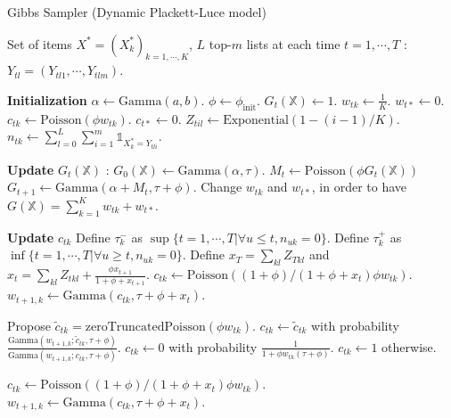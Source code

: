 \documentclass{article}
\begin{document}
\begin{algorithm}
\caption{Gibbs Sampler (Dynamic Plackett-Luce model)}
\begin{algorithmic}
\REQUIRE Set of items $X^*=(X_k^*)_{k=1,\cdots,K}$, $L$ top-$m$ lists at each time $t=1,\cdots,T$ : $Y_{tl}=(Y_{tl1},\cdots,Y_{tlm})$.

\STATE \textbf{Initialization}
\STATE $\alpha\leftarrow\text{Gamma}(a,b)$.
\STATE $\phi\leftarrow\phi_\text{init}$.
\STATE $G_t(\mathbb{X})\leftarrow 1$.
\STATE $w_{tk}\leftarrow\frac{1}{K}$.
\STATE $w_{t*}\leftarrow 0$.
\STATE $c_{tk}\leftarrow\text{Poisson}(\phi w_{tk})$.
\STATE $c_{t*}\leftarrow 0$.
\STATE $Z_{til}\leftarrow\text{Exponential}(1-(i-1)/K)$.
\STATE $n_{tk}\leftarrow\sum_{l=0}^L \sum_{i=1}^m \mathbb{1}_{X_k^*=Y_{tli}}$.

\STATE


\STATE \textbf{Update }$G_t(\mathbb{X})$ :
\STATE $G_0(\mathbb{X})\leftarrow\text{Gamma}(\alpha,\tau)$.
\STATE $M_t\leftarrow\text{Poisson}(\phi G_t(\mathbb{X}))$
\STATE $G_{t+1}\leftarrow\text{Gamma}(\alpha +M_t,\tau+\phi)$.
\ENDFOR
\STATE Change $w_{tk}$ and $w_{t*}$, in order to have $G(\mathbb{X})=\sum_{k=1}^K w_{tk} + w_{t*}$.

\STATE

\STATE \textbf{Update }$c_{tk}$
\STATE Define $\tau_k^-$ as $\sup\lbrace t=1,\cdots,T \vert \forall u\leqslant t,n_{uk}=0 \rbrace$.
\STATE Define $\tau_k^+$ as $\inf\lbrace t=1,\cdots,T \vert \forall u\geqslant t,n_{uk}=0 \rbrace$.
\STATE Define $x_T=\sum_{kl}Z_{Tkl}$ and $x_{t}=\sum_{kl}Z_{tkl}+\frac{\phi x_{t+1}}{1+\phi+x_{t+1}}$.
\STATE $c_{tk}\leftarrow\text{Poisson}((1+\phi)/(1+\phi+x_t)\phi w_{tk})$.
\STATE $w_{t+1,k}\leftarrow\text{Gamma}(c_{tk},\tau+\phi+x_t)$.
\ENDFOR

\STATE Propose $\tilde{c}_{tk} = \text{zeroTruncatedPoisson}(\phi w_{tk})$.
\STATE $c_{tk}\leftarrow\tilde{c}_{tk}$ with probability $\frac{\text{Gamma}(w_{t+1,k};\tilde{c}_{tk},\tau+\phi)}{\text{Gamma}(w_{t+1,k};c_{tk},\tau+\phi)}$.
\ELSE
\STATE $c_{tk}\leftarrow 0$ with probability $\frac{1}{1+\phi w_{tk}(\tau+\phi)}$.
\STATE $c_{tk}\leftarrow 1$ otherwise.
\ENDIF

\ENDFOR

\STATE $c_{tk}\leftarrow\text{Poisson}((1+\phi)/(1+\phi+x_t)\phi w_{tk})$.
\STATE $w_{t+1,k}\leftarrow\text{Gamma}(c_{tk},\tau+\phi+x_t)$.
\ENDFOR



\end{algorithmic}
\end{algorithm}
\end{document}
